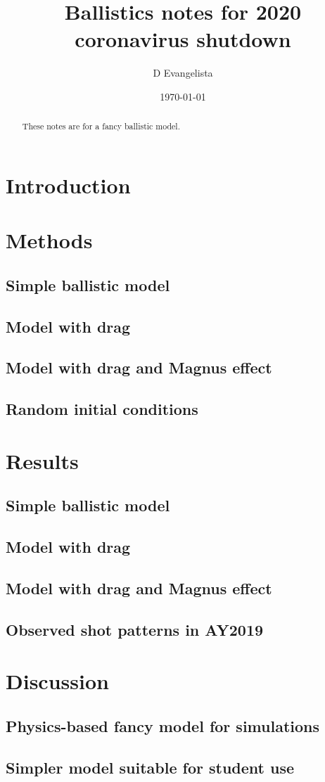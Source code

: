\documentclass{article}
\title{Ballistics notes for 2020 coronavirus shutdown}
\author{D Evangelista}
\date{\today}
\begin{document}
\maketitle
\begin{abstract}
These notes are for a fancy ballistic model.   
\end{abstract}

\section{Introduction}

\section{Methods}
\subsection{Simple ballistic model}
\subsection{Model with drag}
\subsection{Model with drag and Magnus effect}
\subsection{Random initial conditions}

\section{Results}
\subsection{Simple ballistic model}
\subsection{Model with drag}
\subsection{Model with drag and Magnus effect}
\subsection{Observed shot patterns in AY2019}

\section{Discussion}
\subsection{Physics-based fancy model for simulations}
\subsection{Simpler model suitable for student use}
\end{document}
